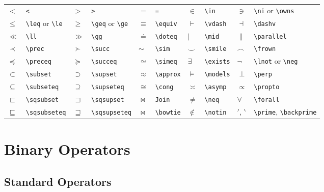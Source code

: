 \documentclass[10pt, english]{article}
\begin{document}
	\begin{center}
		\scriptsize
	\begin{tabular}{ll|ll|ll|ll|ll}
		$<$ & \verb|<| & $>$ & \verb|>| & $=$ & \verb|=| & $\in$ & \verb|\in| & $\ni$ & \verb|\ni| or \verb|\owns| \\
		$\le$ & \verb|\leq| or \verb|\le| & $\ge$ & \verb|\geq| or \verb|\ge| & $\equiv$ & \verb|\equiv| & $\vdash$ & \verb|\vdash| & $\dashv$ & \verb|\dashv| \\
		$\ll$ & \verb|\ll| & $\gg$ & \verb|\gg| & $\doteq$ & \verb|\doteq| & $\mid$ & \verb|\mid| & $\parallel$ & \verb|\parallel| \\
		$\prec$ & \verb|\prec| & $\succ$ & \verb|\succ| & $\sim$ & \verb|\sim| & $\smile$ & \verb|\smile| & $\frown$ & \verb|\frown| \\
		$\preceq$ & \verb|\preceq| & $\succeq$ & \verb|\succeq| & $\simeq$ & \verb|\simeq| & $\exists$ & \verb|\exists| & $\lnot$ & \verb|\lnot| or \verb|\neg| \\
		$\subset$ & \verb|\subset| & $\supset$ & \verb|\supset| & $\approx$ & \verb|\approx| & $\models$ & \verb|\models| & $\perp$ & \verb|\perp| \\
		$\subseteq$ & \verb|\subseteq| & $\supseteq$ & \verb|\supseteq| & $\cong$ & \verb|\cong| & $\asymp$ & \verb|\asymp| & $\propto$ & \verb|\propto| \\
		$\sqsubset$ & \verb|\sqsubset| & $\sqsupset$ & \verb|\sqsupset| & $\Join$ & \verb|Join| & $\neq$ & \verb|\neq| & $\forall$ & \verb|\forall| \\
		$\sqsubseteq$ & \verb|\sqsubseteq| & $\sqsupseteq$ & \verb|\sqsupseteq| & $\bowtie$ & \verb|\bowtie| & $\notin$ & \verb|\notin| & $\prime$, $\backprime$ & \verb|\prime|, \verb|\backprime| \\
	\end{tabular}
	\end{center}

\section{Binary Operators}

	\subsection{Standard Operators}
\end{document}
